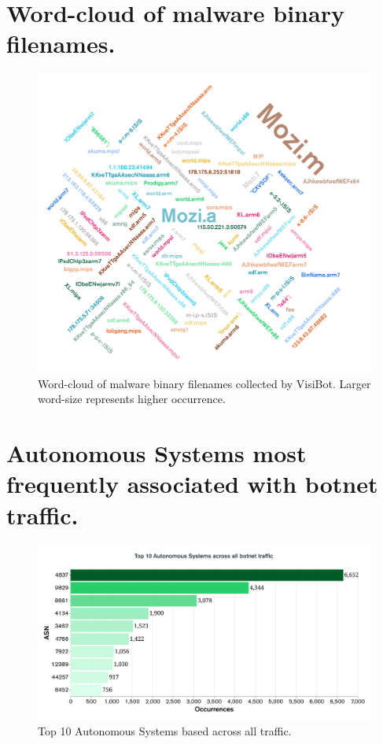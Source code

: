 \begin{appendices}
\section{Word-cloud of malware binary filenames.}
\label{appendix_a8}
\begin{figure}[!htb]
    \centering
    \includegraphics[width=1.0\linewidth]{results/wordcloud.png}
    \caption{Word-cloud of malware binary filenames collected by VisiBot. Larger word-size represents higher occurrence.}
    \label{fig:wordcloud} 
\end{figure}


\newpage

\section{Autonomous Systems most frequently associated with botnet traffic.}
\label{appendix_a9}
\begin{figure}[!htb]
    \centering
    \includegraphics[width=0.75\linewidth]{results/top_10_asn_overall.png}
    \caption{Top 10 Autonomous Systems based across all traffic.}
    \label{fig:top_10_asn_all} 
\end{figure}


\end{appendices}
